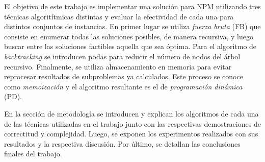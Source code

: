El objetivo de este trabajo es implementar una solución para NPM utilizando tres técnicas algoritítmicas distintas y evaluar la efectividad de cada una para distintos conjuntos de instancias. En primer lugar se utiliza \textit{fuerza bruta} (FB) que consiste en enumerar todas las soluciones posibles, de manera recursiva, y luego buscar entre las soluciones factibles aquella que sea óptima. Para el algoritmo de \textit{backtracking} se introducen podas para reducir el número de nodos del árbol recursivo. Finalmente, se utiliza almacenamiento en memoria para evitar reprocesar resultados de subproblemas ya calculados. Este proceso se conoce como \textit{memoización} y el algoritmo resultante es el de \textit{programación dinámica} (PD).

En la sección de metodología se introducen y explican los algoritmos de cada una de las técnicas utilizadas en el trabajo junto con las respectivas demostraciones de correctitud y complejidad. Luego, se exponen los experimentos realizados con sus resultados y la respectiva discusión. Por último, se detallan las conclusiones finales del trabajo.

